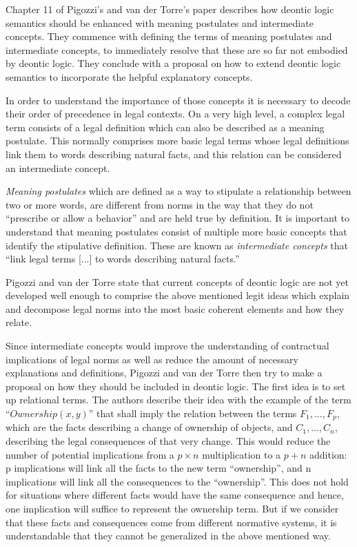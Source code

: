 \documentclass[12pt]{article}
\begin{document}
\maketitle



Chapter 11 of Pigozzi’s and van der Torre’s paper \cite{pigozzi2017multiagent} describes how deontic logic semantics should be enhanced with meaning postulates and intermediate concepts. They commence with defining the terms of meaning postulates and intermediate concepts, to immediately resolve that these are so far not embodied by deontic logic. They conclude with a proposal on how to extend deontic logic semantics to incorporate the helpful explanatory concepts.

In order to understand the importance of those concepts it is necessary to decode their order of precedence in legal contexts. On a very high level, a complex legal term consists of a legal definition which can also be described as a meaning postulate. This normally comprises more basic legal terms whose legal definitions link them to words describing natural facts, and this relation can be considered an intermediate concept.

\emph{Meaning postulates} which are defined as a way to stipulate a relationship between two or more words, are different from norms in the way that they do not \enquote{prescribe or allow a behavior} and are held true by definition. It is important to understand that meaning postulates consist of multiple more basic concepts that identify the stipulative definition. These are known as \emph{intermediate concepts} that \enquote{link legal terms [...] to words describing natural facts.}

Pigozzi and van der Torre state that current concepts of deontic logic are not yet developed well enough to comprise the above mentioned legit ideas which explain and decompose legal norms into the most basic coherent elements and how they relate.

Since intermediate concepts would improve the understanding of contractual implications of legal norms as well as reduce the amount of necessary explanations and definitions, Pigozzi and van der Torre then try to make a proposal on how they should be included in deontic logic. 
The first idea is to set up relational terms. The authors describe their idea with the example of the term  \enquote{$\mathit{Ownership}(x,y)$} that shall imply the relation between the terms $F_1,...,F_p$, which are the facts describing a change of ownership of objects,  and $C_1,...,C_n$, describing the legal consequences of that very change. This would reduce the number of potential implications from a $p \times n$ multiplication to a $p + n$ addition: p implications will link all the facts to the new term \enquote{ownership}, and n implications will link all the consequences to the \enquote{ownership}. This does not hold for situations where different facts would have the same consequence and hence, one implication will suffice to represent the ownership term. But if we consider that these facts and consequences come from different normative systems, it is understandable that they cannot be generalized in the above mentioned way.
\end{document}
